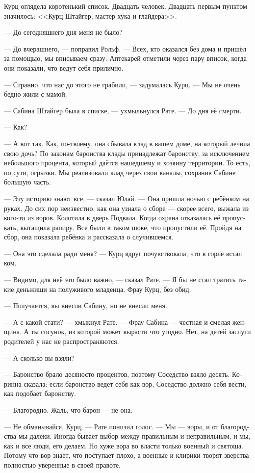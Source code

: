 \documentclass[a4paper,12pt,fleqn]{book}\usepackage{cooltooltips}\usepackage{polyglossia}\setdefaultlanguage[babelshorthands=true]{russian}\setotherlanguage{english}\defaultfontfeatures{Ligatures=TeX,Mapping=tex-text} \usepackage{xcolor}\definecolor{lightgray}{HTML}{bbbbbb}\color{lightgray}\newcommand{\ml}[3]{\textenglish{\textcolor{black}{#3}}}
\begin{document}
Курц оглядела коротенький список.
Двадцать человек.
Двадцать первым пунктом значилось: <<Курц Штайгер, мастер хука и глайдера>>.

--- До сегодняшнего дня меня не было?

--- До вчерашнего, --- поправил Рольф.
--- Всех, кто оказался без дома и пришёл за помощью, мы вписываем сразу.
Аптекарей отметили через пару вписок, когда они показали, что ведут себя прилично.

--- Странно, что нас до этого не грабили, --- задумалась Курц.
--- Мы не очень бедно жили с мамой.

--- Сабина Штайгер была в списке, --- ухмыльнулся Рате.
--- До дня её смерти.

--- Как?

--- А вот так.
Как, по-твоему, она сбывала клад в вашем доме, на который лечила свою дочь?
По законам баронства клады принадлежат баронству, за исключением небольшого процента, который даётся нашедшему и хозяину территории.
То есть, по сути, огрызки.
Мы реализовали клад через свои каналы, сохранив Сабине большую часть.

--- Эту историю знают все, --- сказал Юлай.
--- Она пришла ночью с ребёнком на руках.
До сих пор неизвестно, как она узнала о сборе --- скорее всего, выжала из кого-то из воров.
Колотила в дверь Подвала.
Когда охрана отказалась её пропускать, вытащила рапиру.
Все были в таком шоке, что пропустили её.
Пройдя на сбор, она показала ребёнка и рассказала о случившемся.

--- Она это сделала ради меня? --- Курц вдруг почувствовала, что в горле встал ком.

--- Видимо, для неё это было важно, --- сказал Рате.
--- Я бы не стал тратить такие деньжищи на полуживого младенца.
Фрау Курц, без обид.

--- Получается, вы внесли Сабину, но не внесли меня.

--- А с какой стати? --- хмыкнул Рате.
--- Фрау Сабина --- честная и смелая женщина.
А ты сосунок, из которой может вырасти что угодно.
Нет, на детей заслуги родителей у нас не распространяются.

--- А сколько вы взяли?

--- Баронство брало десяносто процентов, поэтому Соседство взяло десять.
Коринна сказала: если баронство ведет себя как вор, Соседство должно себя вести, как подобает баронству.

--- Благородно.
Жаль, что барон — не она.

--- Не обманывайся, Курц, --- Рате понизил голос.
--- Мы --- воры, и от благородства мы далеки.
Иногда бывает выбор между правильным и неправильным, и мы, как и все люди, его делаем.
Но хуже вора во власти только военный и святоша.
Потому что вор знает, что поступает плохо, а военные и клирики творят зверства полностью уверенные в своей правоте.
\end{document}
